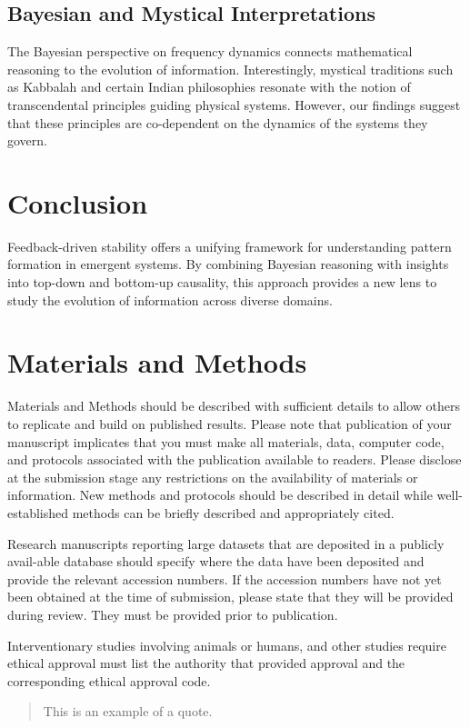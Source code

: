 \documentclass[entropy,article,submit,pdftex,moreauthors]{Definitions/mdpi}
\begin{document}
\subsection{Bayesian and Mystical Interpretations}

The Bayesian perspective on frequency dynamics connects mathematical reasoning to the evolution of information. Interestingly, mystical traditions such as Kabbalah and certain Indian philosophies resonate with the notion of transcendental principles guiding physical systems. However, our findings suggest that these principles are co-dependent on the dynamics of the systems they govern.

\section{Conclusion}

Feedback-driven stability offers a unifying framework for understanding pattern formation in emergent systems. By combining Bayesian reasoning with insights into top-down and bottom-up causality, this approach provides a new lens to study the evolution of information across diverse domains.




\section{Materials and Methods}

Materials and Methods should be described with sufficient details to allow others to replicate and build on published results. Please note that publication of your manuscript implicates that you must make all materials, data, computer code, and protocols associated with the publication available to readers. Please disclose at the submission stage any restrictions on the availability of materials or information. New methods and protocols should be described in detail while well-established methods can be briefly described and appropriately cited.

Research manuscripts reporting large datasets that are deposited in a publicly avail-able database should specify where the data have been deposited and provide the relevant accession numbers. If the accession numbers have not yet been obtained at the time of submission, please state that they will be provided during review. They must be provided prior to publication.

Interventionary studies involving animals or humans, and other studies require ethical approval must list the authority that provided approval and the corresponding ethical approval code.
\begin{quote}
This is an example of a quote.
\end{quote}
\end{document}
